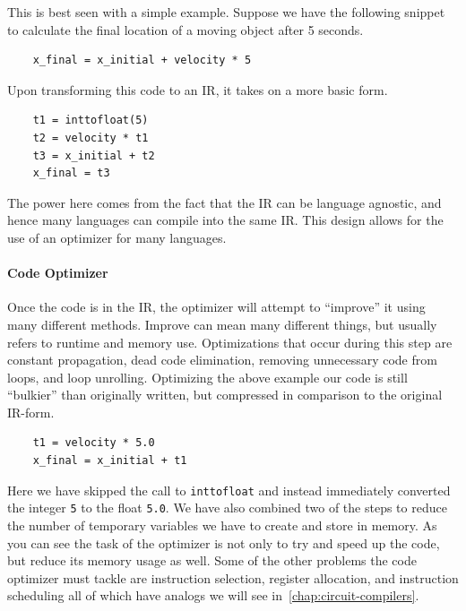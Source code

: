This is best seen with a simple example.
Suppose we have the following snippet to calculate the final location of a moving object after 5 seconds.
\begin{lstlisting}
    x_final = x_initial + velocity * 5
\end{lstlisting}
Upon transforming this code to an \ac{IR}, it takes on a more basic form.
\begin{lstlisting}
    t1 = inttofloat(5)
    t2 = velocity * t1
    t3 = x_initial + t2
    x_final = t3
\end{lstlisting}
The power here comes from the fact that the \acf{IR} can be language agnostic, and hence many languages can compile into the same \ac{IR}.
This design allows for the use of an optimizer for many languages.

\paragraph{Code Optimizer}
Once the code is in the \ac{IR}, the optimizer will attempt to ``improve'' it using many different methods.
Improve can mean many different things, but usually refers to runtime and memory use.
Optimizations that occur during this step are constant propagation, dead code elimination, removing unnecessary code from loops, and loop unrolling.
Optimizing the above example our code is still ``bulkier'' than originally written, but compressed in comparison to the original \ac{IR}-form.
\begin{lstlisting}
    t1 = velocity * 5.0
    x_final = x_initial + t1
\end{lstlisting}
Here we have skipped the call to \texttt{inttofloat} and instead immediately converted the integer \texttt{5} to the float \texttt{5.0}.
We have also combined two of the steps to reduce the number of temporary variables we have to create and store in memory.
As you can see the task of the optimizer is not only to try and speed up the code, but reduce its memory usage as well.
Some of the other problems the code optimizer must tackle are instruction selection, register allocation, and instruction scheduling all of which have analogs we will see in~\cref{chap:circuit-compilers}.

